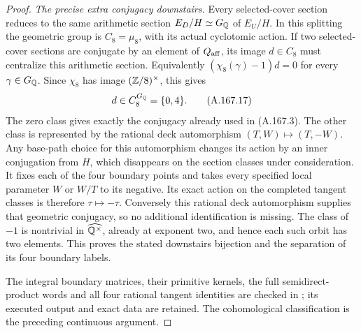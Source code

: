 \begin{proof}
\emph{The precise extra conjugacy downstairs.}
Every selected-cover section reduces to the same arithmetic section
\(E_D/H\simeq G_\mathbb Q\) of \(E_U/H\).
In this splitting the geometric group is \(C_8=\mu_8\), with its
actual cyclotomic action.  If two selected-cover sections are
conjugate by an element of \(Q_{\rm aff}\), its image
\(d\in C_8\) must centralize this arithmetic section.  Equivalently
\((\chi_8(\gamma)-1)d=0\) for every \(\gamma\in G_\mathbb Q\).
Since \(\chi_8\) has image \((\mathbb Z/8)^\times\), this gives
\[
                         d\in C_8^{G_\mathbb Q}=\{0,4\}.
\tag{A.167.17}
\]
The zero class gives exactly the conjugacy already used in
(A.167.3).  The other class is represented by the rational deck
automorphism \((T,W)\mapsto(T,-W)\).  Any base-path choice for
this automorphism changes its action by an inner conjugation from
\(H\), which disappears on the section classes under consideration.
It fixes each of the four boundary points and takes every specified
local parameter \(W\) or \(W/T\) to its negative.  Its exact
action on the completed tangent classes is therefore
\(\tau\mapsto-\tau\).  Conversely this rational deck
automorphism supplies that geometric conjugacy, so no additional
identification is missing.  The class of \(-1\) is nontrivial in
\(\widehat{\mathbb Q^\times}\), already at exponent two, and hence
each such orbit has two elements.  This proves the stated downstairs
bijection and the separation of its four boundary labels.

The integral boundary matrices, their primitive kernels, the full
semidirect-product words and all four rational tangent identities are
checked in ; its
executed output and exact data are retained.  The cohomological
classification is the preceding continuous argument.
\end{proof}
